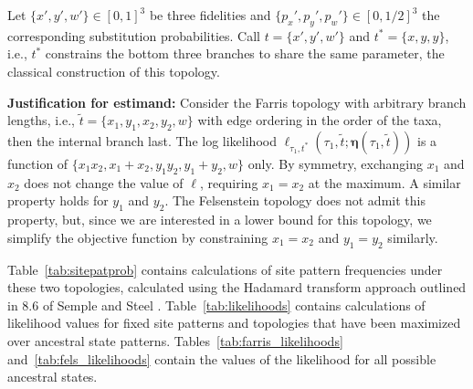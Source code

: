 \documentclass{article}
\newcommand{\fullAncestralSplitPartitions}{\boldsymbol\eta}
\begin{document}
Let $\{x',y',w'\}\in[0,1]^3$ be three fidelities and $\{p_x',p_y',p_w'\}\in[0,1/2]^3$ the corresponding substitution probabilities.
Call $t=\{x',y',w'\}$ and $t^*=\{x,y,y\}$, i.e., $t^*$ constrains the bottom three branches to share the same parameter, the classical construction of this topology.

\textbf{Justification for estimand:} Consider the Farris topology with arbitrary branch lengths, i.e., $\tilde{t}=\{x_1,y_1,x_2,y_2,w\}$ with edge ordering in the order of the taxa, then the internal branch last.
The log likelihood $\ell_{\tau_1,t^*}(\tau_1, \tilde{t}; \fullAncestralSplitPartitions(\tau_1,\tilde{t}))$ is a function of $\{x_1x_2, x_1+x_2, y_1y_2, y_1+y_2, w\}$ only.
By symmetry, exchanging $x_1$ and $x_2$ does not change the value of $\ell$, requiring $x_1=x_2$ at the maximum.
A similar property holds for $y_1$ and $y_2$.
The Felsenstein topology does not admit this property, but, since we are interested in a lower bound for this topology, we simplify the objective function by constraining $x_1=x_2$ and $y_1=y_2$ similarly.

Table~\ref{tab:sitepatprob} contains calculations of site pattern frequencies under these two topologies, calculated using the Hadamard transform approach outlined in 8.6 of Semple and Steel \cite{Semple2003-em}.
Table~\ref{tab:likelihoods} contains calculations of likelihood values for fixed site patterns and topologies that have been maximized over ancestral state patterns.
Tables~\ref{tab:farris_likelihoods} and~\ref{tab:fels_likelihoods} contain the values of the likelihood for all possible ancestral states.
\end{document}
